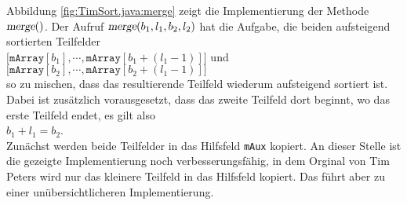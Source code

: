 Abbildung \ref{fig:TimSort.java:merge} zeigt die Implementierung der Methode $\textsl{merge}()$.
Der Aufruf $\textsl{merge}(b_1, l_1, b_2, l_2)$ hat die Aufgabe, die beiden aufsteigend sortierten Teilfelder
\\[0.2cm]
\hspace*{0.8cm}
$\bigl[ \texttt{mArray}[b_1], \cdots, \texttt{mArray}[b_1 + (l_1 - 1)]\bigr]$ \quad und \quad
$\bigl[ \texttt{mArray}[b_2], \cdots, \texttt{mArray}[b_2 + (l_1 - 1)]\bigr]$ 
\\[0.2cm]
so zu mischen, dass das resultierende Teilfeld wiederum aufsteigend sortiert ist.  Dabei ist
zus\"atzlich vorausgesetzt, dass das zweite Teilfeld dort beginnt, wo das erste Teilfeld endet, es
gilt also
\\[0.2cm]
\hspace*{1.3cm}
$b_1 + l_1 = b_2$.
\\[0.2cm]
Zun\"achst werden beide Teilfelder in das Hilfsfeld \texttt{mAux} kopiert.  An dieser Stelle ist die
gezeigte Implementierung noch verbesserungsf\"ahig, in dem Orginal von Tim Peters wird nur das
kleinere Teilfeld in das Hilfsfeld kopiert.  Das f\"uhrt aber zu einer un\"ubersichtlicheren
Implementierung.

